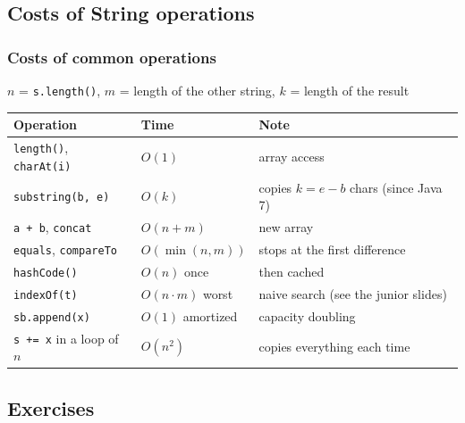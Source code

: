 \documentclass[aspectratio=169,10pt,compress]{beamer}
\begin{document}

\subsection[Costs]{Costs of String operations}




\begin{frame}[t,fragile] \frametitle{Costs of common operations}
  \small $n$ = \texttt{s.length()}, $m$ = length of the other string, $k$ = length of the result
  \vspace{0.3em}

  \begin{tabular}{@{}L{0.36\textwidth}L{0.17\textwidth}L{0.38\textwidth}@{}}
    \toprule
    \textbf{Operation} & \textbf{Time} & \textbf{Note} \\
    \midrule
    \texttt{length()}, \texttt{charAt(i)}       & $O(1)$        & array access \\
    \texttt{substring(b, e)}                    & $O(k)$        & copies $k = e - b$ chars (since Java 7) \\
    \texttt{a + b}, \texttt{concat}             & $O(n + m)$    & new array \\
    \texttt{equals}, \texttt{compareTo}         & $O(\min(n, m))$ & stops at the first difference \\
    \texttt{hashCode()}                         & $O(n)$ once   & then cached \\
    \texttt{indexOf(t)}                         & $O(n \cdot m)$ worst & naive search (see the junior slides) \\
    \texttt{sb.append(x)}                       & $O(1)$ amortized & capacity doubling \\
    \texttt{s += x} in a loop of $n$            & $O(n^{2})$    & copies everything each time \\
    \bottomrule
  \end{tabular}
\end{frame}

\subsection[Exercises]{Exercises}
\end{document}
